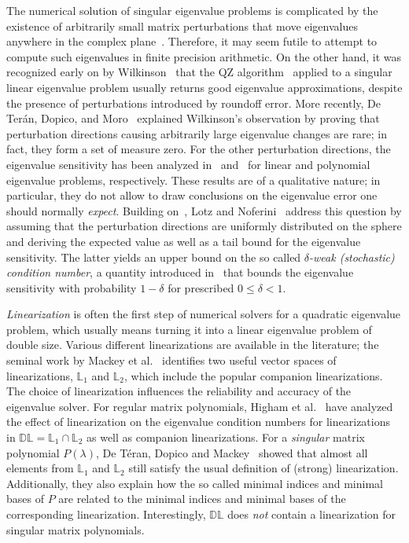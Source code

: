 \documentclass[12pt]{article}
\begin{document}
The numerical solution of singular eigenvalue problems is complicated by the existence of arbitrarily small matrix perturbations that move eigenvalues anywhere in the complex plane~\cite{kaagstrom20008}. Therefore, it may seem futile to attempt to compute such eigenvalues in finite precision arithmetic. On the other hand, it was recognized early on by Wilkinson~\cite{wilkinson1979kronecker} that the QZ algorithm~\cite{Golub2013} applied to a singular linear eigenvalue problem usually returns good eigenvalue approximations, despite the presence of perturbations introduced by roundoff error.
More recently, De Ter\'an, Dopico, and Moro~\cite{de2008first} explained Wilkinson's observation by proving that perturbation directions causing arbitrarily large eigenvalue changes are rare; in fact, they form a set of measure zero. For the other perturbation directions, the eigenvalue sensitivity has been analyzed in~\cite{de2008first} and~\cite{de2010first} for linear and polynomial eigenvalue problems, respectively. These results are of a qualitative nature; in particular, they do not allow to draw conclusions on the eigenvalue error one should normally \emph{expect}. Building on~\cite{de2008first,de2010first}, Lotz and Noferini~\cite{lotz2020wilkinson} address this question by assuming that the perturbation directions are uniformly distributed on the sphere and deriving the expected value as well as a tail bound for the eigenvalue sensitivity. The latter yields an upper bound on the so called \emph{$\delta$-weak (stochastic) condition number}, a quantity introduced in~\cite{lotz2020wilkinson} that bounds the eigenvalue sensitivity with probability $1-\delta$ for prescribed $0 \le \delta < 1$.

\emph{Linearization} is often the first step of numerical solvers for a quadratic eigenvalue problem, which usually means turning it into a linear eigenvalue problem of double size. Various different linearizations are available in the literature; the seminal work by Mackey et al.~\cite{mackey2006vector} identifies two useful vector spaces of linearizations, $\mathbb{L}_1$ and $\mathbb{L}_2$, which include the popular companion linearizations. The choice of linearization influences the reliability and accuracy of the eigenvalue solver. For regular matrix polynomials, Higham et al.~\cite{higham2006conditioning} have analyzed the effect of linearization on the eigenvalue condition numbers for linearizations in $\mathbb{DL} = \mathbb{L}_1\cap \mathbb{L}_2$ as well as companion linearizations. For a \emph{singular} matrix polynomial $P(\lambda)$, 
De T\'eran, Dopico and Mackey~\cite{de2009linearizations} showed that almost all elements from $\mathbb{L}_1$ and $\mathbb{L}_2$ still satisfy the usual definition of (strong) linearization. Additionally, they also explain how the so called minimal indices and minimal bases of $P$ are related to the minimal indices and minimal bases of the corresponding linearization. Interestingly, $\mathbb{DL}$ does \emph{not} contain a linearization for singular matrix polynomials.
\end{document}
